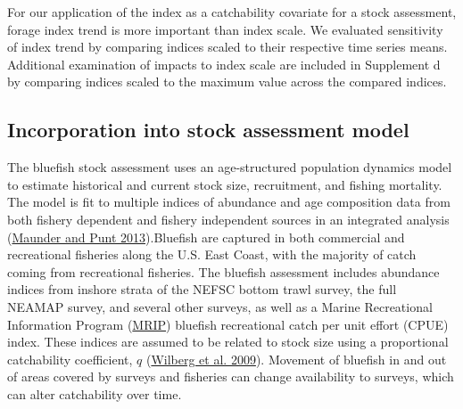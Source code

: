 \documentclass[
]{article}
\begin{document}
For our application of the index as a catchability covariate for a stock assessment, forage index trend is more important than index scale. We evaluated sensitivity of index trend by comparing indices scaled to their respective time series means. Additional examination of impacts to index scale are included in Supplement d by comparing indices scaled to the maximum value across the compared indices.

\hypertarget{incorporation-into-stock-assessment-model}{%
\subsection{Incorporation into stock assessment model}\label{incorporation-into-stock-assessment-model}}

The bluefish stock assessment uses an age-structured population dynamics model to estimate historical and current
stock size, recruitment, and fishing mortality. The model is fit to multiple indices of abundance and age composition
data from both fishery dependent and fishery independent sources in an integrated analysis (\protect\hyperlink{ref-maunder_review_2013}{Maunder and Punt 2013}).Bluefish are captured in both commercial and recreational fisheries along the U.S. East Coast, with the majority of catch coming from recreational fisheries. The bluefish assessment includes abundance indices from inshore strata of the NEFSC bottom trawl survey, the full NEAMAP survey, and several other surveys, as well as a Marine Recreational Information Program (\href{https://www.fisheries.noaa.gov/recreational-fishing-data/about-marine-recreational-information-program}{MRIP}) bluefish recreational catch per unit effort (CPUE) index. These indices are assumed to be related to stock size using a proportional catchability coefficient, \(q\) (\protect\hyperlink{ref-wilberg_incorporating_2009}{Wilberg et al. 2009}). Movement of bluefish in and out of areas
covered by surveys and fisheries can change availability to surveys, which can alter catchability over time.
\end{document}
